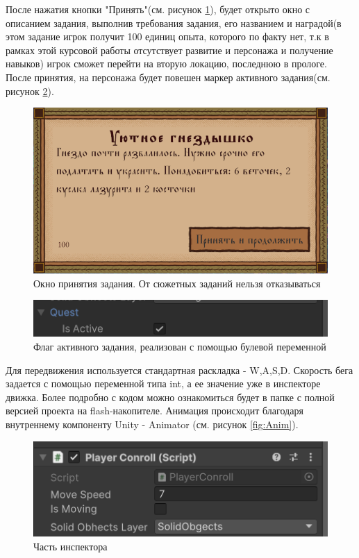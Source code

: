 \documentclass[bachelor, och, coursework, times]{SCWorks}
\begin{document}
    После нажатия кнопки "Принять"(см. рисунок \ref{fig:Quest}), будет открыто окно с описанием задания, выполнив требования
    задания, его названием и наградой(в этом задание игрок получит 100 единиц опыта, которого по факту нет,
     т.к в рамках этой курсовой работы отсутствует развитие и персонажа и получение навыков) 
     игрок сможет перейти на вторую локацию, последнюю в прологе. 
    После принятия, на персонажа будет повешен маркер активного задания(см. рисунок \ref{fig:QuestFlag}). 


    \begin{figure} [H]
        \centering
    \includegraphics[width=0.50\linewidth]{Pictures/Снимок экрана 2025-06-24 212841.png}
    \caption{Окно принятия задания. От сюжетных заданий нельзя отказываться}
    \label{fig:Quest}
    \end{figure}


      \begin{figure} [H]
        \centering
    \includegraphics[width=0.50\linewidth]{Pictures/Снимок экрана 2025-06-24 213521.png}
    \caption{Флаг активного задания, реализован с помощью булевой переменной}
    \label{fig:QuestFlag}
    \end{figure}

    Для передвижения используется стандартная раскладка - W,A,S,D. Скорость бега
    задается с помощью переменной типа int, а ее значение уже в инспекторе движка.
    Более подробно с кодом можно ознакомиться будет в папке с полной версией проекта на
    flash-накопителе. Анимация происходит благодаря внутреннему компоненту Unity - Animator
    (см. рисунок \ref{fig:Anim}).
    


 \begin{figure} [H]
        \centering
    \includegraphics[width=0.50\linewidth]{Pictures/Снимок экрана 2025-06-24 214047.png}
    \caption{Часть инспектора}
    \label{fig:Move}
    \end{figure}
\end{document}

